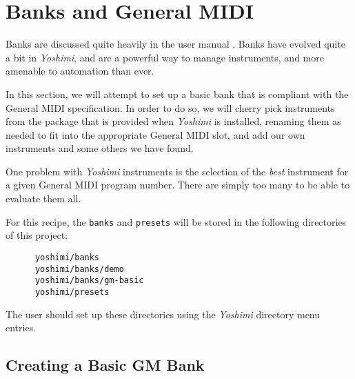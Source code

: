 %
%
%

\section{Banks and General MIDI}
\label{sec:cookbook_banks}

   Banks are discussed quite heavily in the user manual \cite{yoshimidoc}.
   Banks have evolved quite a bit in \textsl{Yoshimi}, and are
   a powerful way to manage instruments, and more amenable to automation
   than ever.

   In this section, we will attempt to set up a basic bank that is
   compliant with the General MIDI specification.  In order to do so, we
   will cherry pick instruments from the package that is provided when
   \textsl{Yoshimi} is installed, renaming them as needed to fit into the
   appropriate General MIDI slot, and add our own instruments and some others
   we have found.

   One problem with \textsl{Yoshimi} instruments is the selection of the
   \textsl{best} instrument for a given General MIDI program number.  There are
   simply too many to be able to evaluate them all.

   For this recipe, the \texttt{banks} and \texttt{presets} will
   be stored in the following directories of this project:

   \begin{verbatim}
      yoshimi/banks
      yoshimi/banks/demo
      yoshimi/banks/gm-basic
      yoshimi/presets
   \end{verbatim}

   The user should set up these directories using the \textsl{Yoshimi}
   directory menu entries.

\subsection{Creating a Basic GM Bank}
\label{subsec:cookbook_banks_basic_gm}


